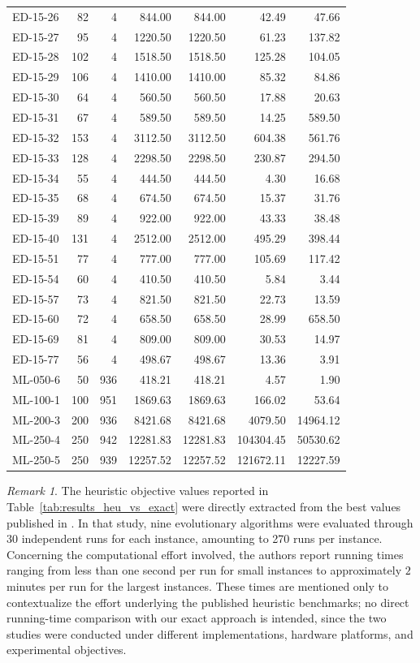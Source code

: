 \documentclass[pdflatex,basic,Numbered]{jnl}%
\theoremstyle{plain}
\theoremstyle{remark}
\newtheorem{remark}{Remark}
\theoremstyle{thmstyleone}%
\theoremstyle{thmstylethree}%
\begin{document}
\begin{longtable}[c]{l r r r r r r}
ED-15-26 & 82 & 4 & 844.00 & 844.00 & 42.49 & 47.66 \\
ED-15-27 & 95 & 4 & 1220.50 & 1220.50 & 61.23 & 137.82 \\
ED-15-28 & 102 & 4 & 1518.50 & 1518.50 & 125.28 & 104.05 \\
ED-15-29 & 106 & 4 & 1410.00 & 1410.00 & 85.32 & 84.86 \\
ED-15-30 & 64 & 4 & 560.50 & 560.50 & 17.88 & 20.63 \\
ED-15-31 & 67 & 4 & 589.50 & 589.50 & 14.25 & 589.50 \\
ED-15-32 & 153 & 4 & 3112.50 & 3112.50 & 604.38 & 561.76 \\
ED-15-33 & 128 & 4 & 2298.50 & 2298.50 & 230.87 & 294.50 \\
ED-15-34 & 55 & 4 & 444.50 & 444.50 & 4.30 & 16.68 \\
ED-15-35 & 68 & 4 & 674.50 & 674.50 & 15.37 & 31.76 \\
ED-15-39 & 89 & 4 & 922.00 & 922.00 & 43.33 & 38.48 \\
ED-15-40 & 131 & 4 & 2512.00 & 2512.00 & 495.29 & 398.44 \\
ED-15-51 & 77 & 4 & 777.00 & 777.00 & 105.69 & 117.42 \\
ED-15-54 & 60 & 4 & 410.50 & 410.50 & 5.84 & 3.44 \\
ED-15-57 & 73 & 4 & 821.50 & 821.50 & 22.73 & 13.59 \\
ED-15-60 & 72 & 4 & 658.50 & 658.50 & 28.99 & 658.50 \\
ED-15-69 & 81 & 4 & 809.00 & 809.00 & 30.53 & 14.97 \\
ED-15-77 & 56 & 4 & 498.67 & 498.67 & 13.36 & 3.91 \\
ML-050-6 & 50 & 936 & 418.21 & 418.21 & 4.57 & 1.90 \\
ML-100-1 & 100 & 951 & 1869.63 & 1869.63 & 166.02 & 53.64 \\
ML-200-3 & 200 & 936 & 8421.68 & 8421.68 & 4079.50 & 14964.12 \\
ML-250-4 & 250 & 942 & 12281.83 & 12281.83 & 104304.45 & 50530.62 \\
ML-250-5 & 250 & 939 & 12257.52 & 12257.52 & 121672.11 & 12227.59 \\

\end{longtable}
\endgroup

\begin{remark}
The heuristic objective values reported in Table~\ref{tab:results_heu_vs_exact} were directly extracted from the best values published in \cite{aledo2018approaching}. In that study, nine evolutionary algorithms were evaluated through 30 independent runs for each instance, amounting to 270 runs per instance. Concerning the computational effort involved, the authors report running times ranging from less than one second per run for small instances to approximately \(2\) minutes per run for the largest instances. These times are mentioned only to contextualize the effort underlying the published heuristic benchmarks; no direct running-time comparison with our exact approach is intended, since the two studies were conducted under different implementations, hardware platforms, and experimental objectives.
\end{remark}
\end{document}
